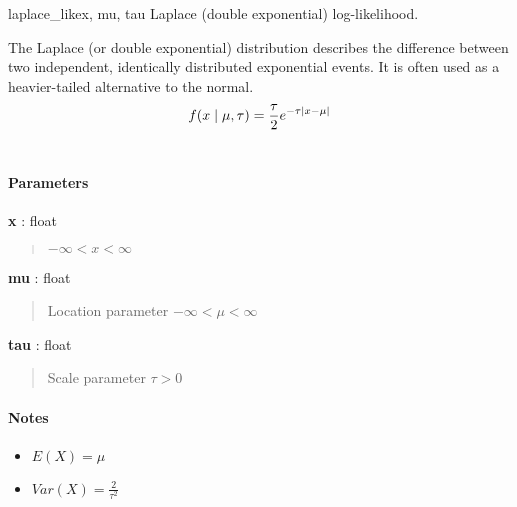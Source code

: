 \hypertarget{pymc.distributions.laplace_like}{}
\begin{funcdesc}{laplace\_like}{x, mu, tau}
Laplace (double exponential) log-likelihood.

The Laplace (or double exponential) distribution describes the
difference between two independent, identically distributed exponential
events. It is often used as a heavier-tailed alternative to the normal.
\begin{gather}
\begin{split}f(x \mid \mu, \tau) = \frac{\tau}{2}e^{-\tau|x-\mu|}\end{split}\notag\\\begin{split}\end{split}\notag
\end{gather}\paragraph{Parameters}\begin{paramlist}

\item[] \textbf{x} : float
\begin{quote}

$-\infty < x < \infty$
\end{quote}

\item[] \textbf{mu} : float
\begin{quote}

Location parameter $-\infty < \mu < \infty$
\end{quote}

\item[] \textbf{tau} : float
\begin{quote}

Scale parameter $\tau > 0$
\end{quote}
\end{paramlist}
\paragraph{Notes}
\begin{itemize}
\item {} 
$E(X) = \mu$

\item {} 
$Var(X) = \frac{2}{\tau^2}$

\end{itemize}
\end{funcdesc}


